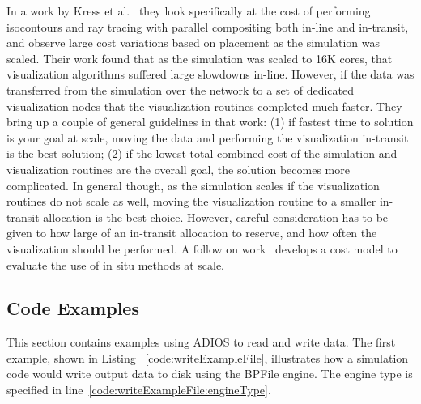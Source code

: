 \documentclass[x11names,table,xcdraw,graybox]{svmult}
\begin{document}
In a work by Kress et al.~\cite{kress2019comparing} they look specifically at the cost of performing isocontours and ray tracing with parallel compositing both in-line and in-transit, and observe large cost variations based on placement as the simulation was scaled. Their work found that as the simulation was scaled to 16K cores, that visualization algorithms suffered large slowdowns in-line. However, if the data was transferred from the simulation over the network to a set of dedicated visualization nodes that the visualization routines completed much faster. They bring up a couple of general guidelines in that work: (1) if fastest time to solution is your goal at scale, moving the data and performing the visualization in-transit is the best solution; (2) if the lowest total combined cost of the simulation and visualization routines are the overall goal, the solution becomes more complicated. In general though, as the simulation scales if the visualization routines do not scale as well, moving the visualization routine to a smaller in-transit allocation is the best choice. However, careful consideration has to be given to how large of an in-transit allocation to reserve, and how often the visualization should be performed. A follow on work~\cite{kress2020Cost} develops a cost model to evaluate the use of in situ methods at scale.


\subsection{Code Examples}
\label{sec:adios:code}
This section contains examples using ADIOS to read and write data.
The first example, shown in Listing ~\ref{code:writeExampleFile}, illustrates how a simulation code would write output data to disk using the BPFile engine.
The engine type is specified in line~\ref{code:writeExampleFile:engineType}.

\end{document}
